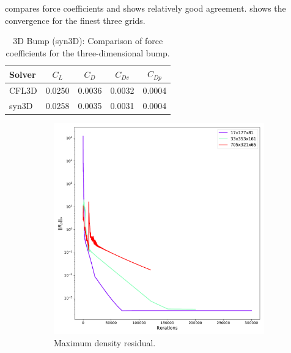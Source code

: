  compares force coefficients and shows relatively good agreement.  shows the convergence for the finest three grids. 
\begin{table}[ht!]
\centering
\caption{3D Bump (syn3D): Comparison of force coefficients for the three-dimensional bump.}
\label{tab:syn3dbump}
\begin{tabular}{@{}l cccc@{}}
\toprule
Solver & $C_L$ & $C_D$ & $C_{Dv}$ & $C_{Dp}$ \\  \midrule
CFL3D & 0.0250 & 0.0036  & 0.0032 & 0.0004  \\  
syn3D &  0.0258 & 0.0035  & 0.0031 & 0.0004  \\  
\bottomrule
\end{tabular}
\end{table}
 \begin{figure}[ht!]
\centering
\begin{subfigure}{.45\textwidth}
  \centering
  \includegraphics[width=1.0\textwidth]{figs/3dbump/convergenceRho.pdf}
  \caption{Maximum density residual.}
\end{subfigure}%
\begin{subfigure}{.45\textwidth}
  \centering

\end{subfigure}
\end{figure}
